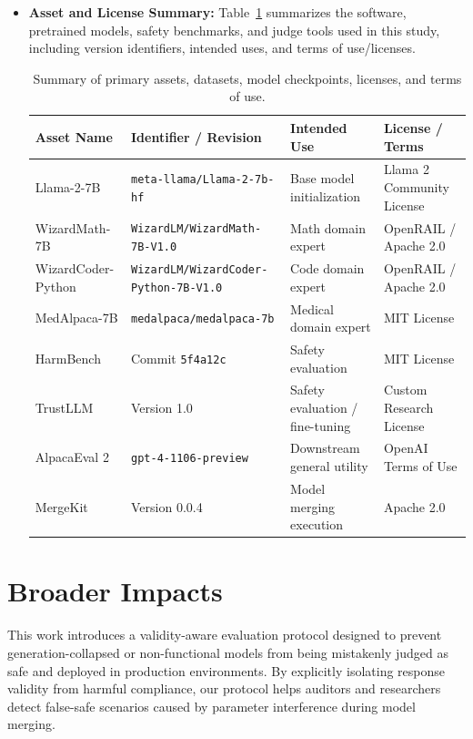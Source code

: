\documentclass{article}
\begin{document}
\begin{itemize}
\begin{itemize}
\item \textbf{Asset and License Summary:}
Table~\ref{tab:asset_license_summary} summarizes the software, pretrained models, safety benchmarks, and judge tools used in this study, including version identifiers, intended uses, and terms of use/licenses.

\begin{table}[htbp]
\centering
\caption{Summary of primary assets, datasets, model checkpoints, licenses, and terms of use.}
\label{tab:asset_license_summary}
\small
\begin{tabular}{p{3.0cm}p{3.5cm}p{3.2cm}p{2.8cm}}
\toprule
\textbf{Asset Name} & \textbf{Identifier / Revision} & \textbf{Intended Use} & \textbf{License / Terms} \\
\midrule
Llama-2-7B & \texttt{meta-llama/Llama-2-7b-hf} & Base model initialization & Llama 2 Community License \\
WizardMath-7B & \texttt{WizardLM/WizardMath-7B-V1.0} & Math domain expert & OpenRAIL / Apache 2.0 \\
WizardCoder-Python & \texttt{WizardLM/WizardCoder-Python-7B-V1.0} & Code domain expert & OpenRAIL / Apache 2.0 \\
MedAlpaca-7B & \texttt{medalpaca/medalpaca-7b} & Medical domain expert & MIT License \\
HarmBench & Commit \texttt{5f4a12c} & Safety evaluation & MIT License \\
TrustLLM & Version 1.0 & Safety evaluation / fine-tuning & Custom Research License \\
AlpacaEval 2 & \texttt{gpt-4-1106-preview} & Downstream general utility & OpenAI Terms of Use \\
MergeKit & Version 0.0.4 & Model merging execution & Apache 2.0 \\
\bottomrule
\end{tabular}
\end{table}

\end{itemize}

\end{itemize}

\section{Broader Impacts}
\label{app:broader_impacts}

This work introduces a validity-aware evaluation protocol designed to prevent generation-collapsed or non-functional models from being mistakenly judged as safe and deployed in production environments. By explicitly isolating response validity from harmful compliance, our protocol helps auditors and researchers detect false-safe scenarios caused by parameter interference during model merging. 
\end{document}
